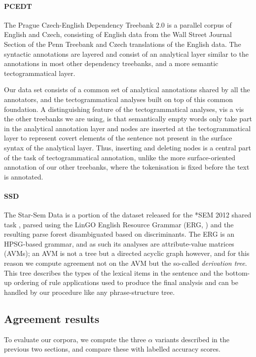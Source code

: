 \documentclass[11pt]{article}
\makeatletter
\let\citeN=\newcite
\def\noparencite#1#2{{#1\if@tempswa , #2\fi}}
\newcommand\citeNP[1]{{\let\@cite=\noparencite\cite{#1}}}
\makeatother
\begin{document}
\paragraph{PCEDT} The Prague Czech-English Dependency Treebank 2.0
\citeN{PCEDT2} is a parallel corpus of English and Czech, consisting of
English data from the Wall Street Journal Section of the Penn Treebank
\cite{Mar:San:Mar93} and Czech translations of the English data. The syntactic
annotations are layered and consist of an analytical layer similar to the
annotations in most other dependency treebanks, and a more semantic
tectogrammatical layer.

Our data set consists of a common set of analytical annotations shared by all
the annotators, and the tectogrammatical analyses built on top of this common
foundation. A distinguishing feature of the tectogrammatical analyses, vis a
vis the other treebanks we are using, is that semantically empty words only
take part in the analytical annotation layer and nodes are inserted at the
tectogrammatical layer to represent covert elements of the sentence not
present in the surface syntax of the analytical layer. Thus, inserting and
deleting nodes is a central part of the task of tectogrammatical annotation,
unlike the more surface-oriented annotation of our other treebanks, where the
tokenisation is fixed before the text is annotated.

\paragraph{SSD} The Star-Sem Data is a portion of the dataset released for the
*SEM 2012 shared task \cite{Mor:Bla12}, parsed using the LinGO English
Resource Grammar (ERG, \citeNP{Flickinger00}) and the resulting parse forest
disambiguated based on discriminants. The ERG is an HPSG-based grammar, and as
such its analyses are attribute-value matrices (AVMs); an AVM is not a tree
but a directed acyclic graph however, and for this reason we compute agreement
not on the AVM but the so-called \emph{derivation tree}. This tree describes
the types of the lexical items in the sentence and the bottom-up ordering of
rule applications used to produce the final analysis and can be handled by our
procedure like any phrase-structure tree.

\subsection{Agreement results}
To evaluate our corpora, we compute the three $\alpha$ variants described in
the previous two sections, and compare these with labelled accuracy scores.
\end{document}
